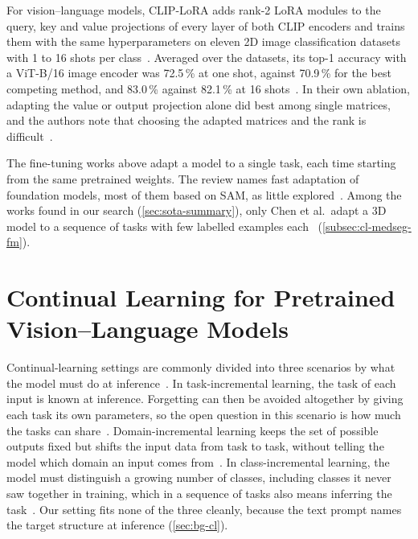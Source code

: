 For vision--language models, CLIP-LoRA adds rank-2 LoRA modules to the query, key and value projections of every layer of both CLIP encoders and trains them with the same hyperparameters on eleven 2D image classification datasets with 1 to 16 shots per class~\cite{zanella2024lowrankfewshotadaptationvisionlanguage}.
Averaged over the datasets, its top-1 accuracy with a ViT-B/16 image encoder was 72.5\,\% at one shot, against 70.9\,\% for the best competing method, and 83.0\,\% against 82.1\,\% at 16 shots~\cite{zanella2024lowrankfewshotadaptationvisionlanguage}.
In their own ablation, adapting the value or output projection alone did best among single matrices, and the authors note that choosing the adapted matrices and the rank is difficult~\cite{zanella2024lowrankfewshotadaptationvisionlanguage}.

The fine-tuning works above adapt a model to a single task, each time starting from the same pretrained weights.
The review names fast adaptation of foundation models, most of them based on SAM, as little explored~\cite[Sec.~5.6]{theekshana26fewshot}.
Among the works found in our search (\cref{sec:sota-summary}), only Chen et al.\ adapt a 3D model to a sequence of tasks with few labelled examples each~\cite{chen2026fewshotcontinuallearning3d} (\cref{subsec:cl-medseg-fm}).

\section[Continual Learning for Pretrained Vision--Language Models]{Continual Learning for Pretrained\texorpdfstring{\newline}{ } Vision--Language Models}
\label{sec:cl-vlm}

Continual-learning settings are commonly divided into three scenarios by what the model must do at inference~\cite{van_de_Ven_2025}.
In task-incremental learning, the task of each input is known at inference.
Forgetting can then be avoided altogether by giving each task its own parameters, so the open question in this scenario is how much the tasks can share~\cite{van_de_Ven_2025}.
Domain-incremental learning keeps the set of possible outputs fixed but shifts the input data from task to task, without telling the model which domain an input comes from~\cite{van_de_Ven_2025}.
In class-incremental learning, the model must distinguish a growing number of classes, including classes it never saw together in training, which in a sequence of tasks also means inferring the task~\cite{van_de_Ven_2025}.
Our setting fits none of the three cleanly, because the text prompt names the target structure at inference (\cref{sec:bg-cl}).

